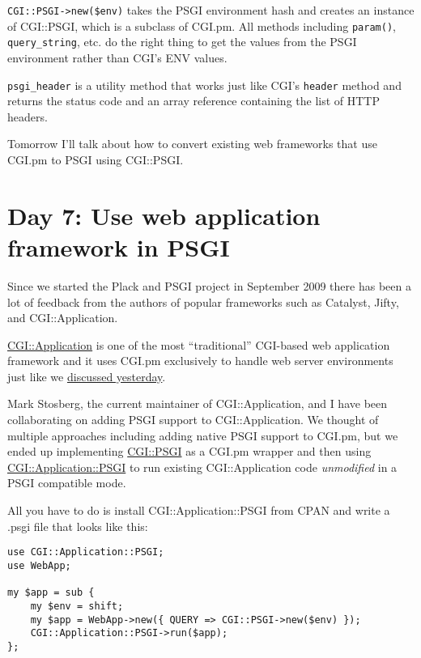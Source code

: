 \lstinline!CGI::PSGI->new($env)! takes the PSGI environment hash and
creates an instance of CGI::PSGI, which is a subclass of CGI.pm. All
methods including \lstinline!param()!, \lstinline!query_string!, etc. do
the right thing to get the values from the PSGI environment rather than
CGI's ENV values.

\lstinline!psgi_header! is a utility method that works just like CGI's
\lstinline!header! method and returns the status code and an array
reference containing the list of HTTP headers.

Tomorrow I'll talk about how to convert existing web frameworks that use
CGI.pm to PSGI using CGI::PSGI.

\chapter{Day 7: Use web application framework in
PSGI}\label{day-7-use-web-application-framework-in-psgi}

Since we started the Plack and PSGI project in September 2009 there has
been a lot of feedback from the authors of popular frameworks such as
Catalyst, Jifty, and CGI::Application.

\href{http://cgi-app.org/}{CGI::Application} is one of the most
``traditional'' CGI-based web application framework and it uses CGI.pm
exclusively to handle web server environments just like we
\href{http://advent.plackperl.org/2009/12/day-6-convert-cgi-apps-to-psgi.html}{discussed
yesterday}.

Mark Stosberg, the current maintainer of CGI::Application, and I have
been collaborating on adding PSGI support to CGI::Application. We
thought of multiple approaches including adding native PSGI support to
CGI.pm, but we ended up implementing
\href{http://search.cpan.org/perldoc?CGI::PSGI}{CGI::PSGI} as a CGI.pm
wrapper and then using
\href{http://search.cpan.org/perldoc?CGI::Application::PSGI}{CGI::Application::PSGI}
to run existing CGI::Application code \emph{unmodified} in a PSGI
compatible mode.

All you have to do is install CGI::Application::PSGI from CPAN and write
a .psgi file that looks like this:

\begin{lstlisting}
use CGI::Application::PSGI;
use WebApp;

my $app = sub {
    my $env = shift;
    my $app = WebApp->new({ QUERY => CGI::PSGI->new($env) });
    CGI::Application::PSGI->run($app);
};
\end{lstlisting}

